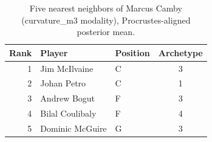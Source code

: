 \begin{table}[htbp]
  \centering\small
  \begin{tabular}{rllc}
    \toprule
    Rank & Player & Position & Archetype \\
    \midrule
    1 & Jim McIlvaine & C & 3 \\
    2 & Johan Petro & C & 1 \\
    3 & Andrew Bogut & F & 3 \\
    4 & Bilal Coulibaly & F & 4 \\
    5 & Dominic McGuire & G & 3 \\
    \bottomrule
  \end{tabular}
  \caption{Five nearest neighbors of Marcus Camby (curvature_m3 modality), Procrustes-aligned posterior mean.}
  \label{tab:Marcus_Camby_neighbors_curvature_m3}
\end{table}

